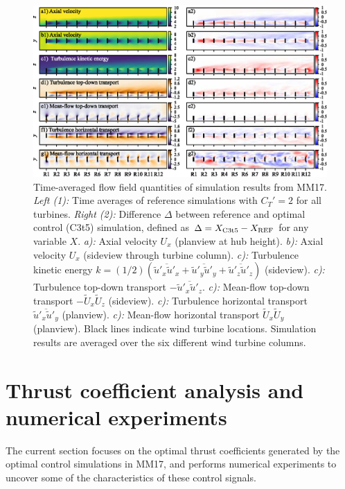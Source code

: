 \documentclass[wes, manuscript]{copernicus}
\begin{document}
\begin{figure}
	\includegraphics[width=\textwidth]{figure4}
	\caption{Time-averaged flow field quantities of simulation results from MM17. \emph{Left (1):} Time averages of reference simulations with $C_T' = 2$ for all turbines. \emph{Right (2):} Difference $\Delta$ between reference and optimal control (C3t5) simulation, defined as $\Delta = X_{\rm C3t5} - X_{\rm REF}$ for any variable $X$. \emph{a):} Axial velocity $U_x$ (planview at hub height). \emph{b):} Axial velocity $U_x$ (sideview through turbine column). \emph{c):} Turbulence kinetic energy $k = (1/2)(\overline{\widetilde{u}'_x \widetilde{u}'_x} + \overline{\widetilde{u}'_y \widetilde{u}'_y} + \overline{\widetilde{u}'_z \widetilde{u}'_z})$ (sideview). \emph{c):} Turbulence top-down transport $ - \overline{\widetilde{u}'_x\widetilde{u}'_z}$. \emph{c):} Mean-flow top-down transport $ - \widetilde{U}_x \widetilde{U}_z$ (sideview). \emph{c):} Turbulence horizontal transport $\overline{\widetilde{u}'_x \widetilde{u}'_y}$ (planview). \emph{c):} Mean-flow horizontal transport $\widetilde{U}_x \widetilde{U}_y$ (planview). Black lines indicate wind turbine locations. Simulation results are averaged over the six different wind turbine columns. \label{fig:flowfield_statistics}}
\end{figure}


\section{Thrust coefficient analysis and numerical experiments}\label{sec:analysis_controls_analysis}

The current section focuses on the optimal thrust coefficients generated by the optimal control simulations in MM17, and performs numerical experiments to uncover some of the characteristics of these control signals. 
\end{document}
